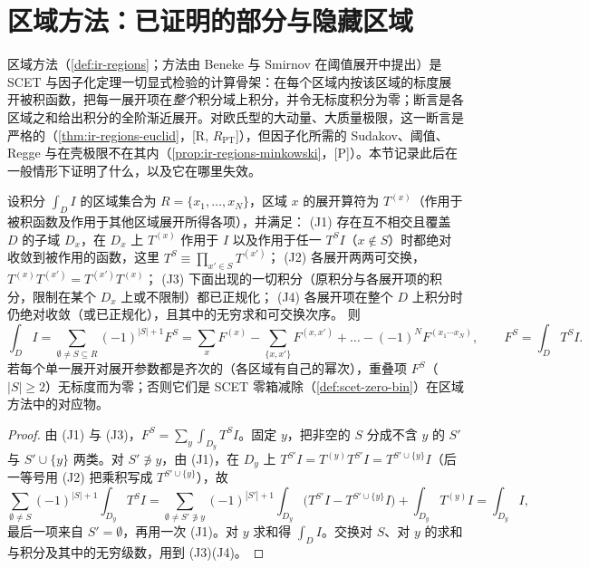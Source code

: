\section{区域方法：已证明的部分与隐藏区域}\label{sec:front-regions}

区域方法（\cref{def:ir-regions}；方法由 Beneke 与 Smirnov 在阈值展开中提出\cite{BenekeSmirnov1998}）是 SCET 与因子化定理一切显式检验的计算骨架：在每个区域内按该区域的标度展开被积函数，把每一展开项在\emph{整个}积分域上积分，并令无标度积分为零；断言是各区域之和给出积分的全阶渐近展开。对欧氏型的大动量、大质量极限，这一断言是严格的（\cref{thm:ir-regions-euclid}，[R, $R_{\mathrm{PT}}$]\cite{Smirnov:1990rz,Smirnov2002}），但因子化所需的 Sudakov、阈值、Regge 与在壳极限不在其内（\cref{prop:ir-regions-minkowski}，[P]）。本节记录此后在一般情形下证明了什么，以及它在哪里失效。

\begin{lemma}\label{lem:front-jantzen}
设积分 $\int_DI$ 的区域集合为 $R=\{x_1,\dots,x_N\}$，区域 $x$ 的展开算符为 $T^{(x)}$（作用于被积函数及作用于其他区域展开所得各项），并满足：
(J1) 存在互不相交且覆盖 $D$ 的子域 $D_x$，在 $D_x$ 上 $T^{(x)}$ 作用于 $I$ 以及作用于任一 $T^{S}I$（$x\notin S$）时都绝对收敛到被作用的函数，这里 $T^S\equiv\prod_{x'\in S}T^{(x')}$；
(J2) 各展开两两可交换，$T^{(x)}T^{(x')}=T^{(x')}T^{(x)}$；
(J3) 下面出现的一切积分（原积分与各展开项的积分，限制在某个 $D_x$ 上或不限制）都已正规化；
(J4) 各展开项在整个 $D$ 上积分时仍绝对收敛（或已正规化），且其中的无穷求和可交换次序。
则
\begin{equation}\label{eq:front-jantzen}
\int_DI=\sum_{\emptyset\ne S\subseteq R}(-1)^{|S|+1}F^{S}
=\sum_xF^{(x)}-\sum_{\{x,x'\}}F^{(x,x')}+\dots-(-1)^NF^{(x_1\cdots x_N)},\qquad F^{S}=\int_DT^{S}I .
\end{equation}
若每个单一展开对展开参数都是齐次的（各区域有自己的幂次），重叠项 $F^S$（$|S|\ge2$）无标度而为零；否则它们是 SCET 零箱减除（\cref{def:scet-zero-bin}）在区域方法中的对应物。
\end{lemma}

\begin{proof}
由 (J1) 与 (J3)，$F^S=\sum_y\int_{D_y}T^SI$。固定 $y$，把非空的 $S$ 分成不含 $y$ 的 $S'$ 与 $S'\cup\{y\}$ 两类。对 $S'\not\ni y$，由 (J1)，在 $D_y$ 上 $T^{S'}I=T^{(y)}T^{S'}I=T^{S'\cup\{y\}}I$（后一等号用 (J2) 把乘积写成 $T^{S'\cup\{y\}}$），故
\begin{equation*}
\sum_{\emptyset\ne S}(-1)^{|S|+1}\int_{D_y}T^SI=\sum_{\emptyset\ne S'\not\ni y}(-1)^{|S'|+1}\int_{D_y}\bigl(T^{S'}I-T^{S'\cup\{y\}}I\bigr)+\int_{D_y}T^{(y)}I=\int_{D_y}I ,
\end{equation*}
最后一项来自 $S'=\emptyset$，再用一次 (J1)。对 $y$ 求和得 $\int_DI$。交换对 $S$、对 $y$ 的求和与积分及其中的无穷级数，用到 (J3)(J4)。
\end{proof}

